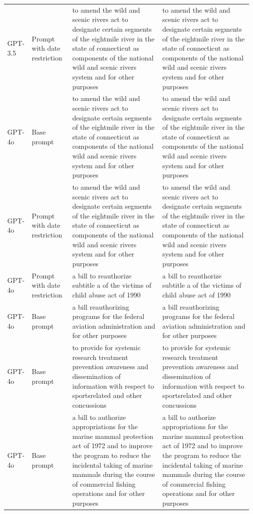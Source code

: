 \begin{longtable}{>{\raggedright\arraybackslash}p{1.4cm}>{\raggedright\arraybackslash}p{1.4cm}>{\raggedright\arraybackslash}p{5.5cm}>{\raggedright\arraybackslash}p{5.5cm}}
GPT-3.5 & Prompt with date restriction & to amend the wild and scenic rivers act to designate certain segments of the eightmile river in the state of connecticut as components of the national wild and scenic rivers system and for other purposes & to amend the wild and scenic rivers act to designate certain segments of the eightmile river in the state of connecticut as components of the national wild and scenic rivers system and for other purposes\\
GPT-4o & Base prompt & to amend the wild and scenic rivers act to designate certain segments of the eightmile river in the state of connecticut as components of the national wild and scenic rivers system and for other purposes & to amend the wild and scenic rivers act to designate certain segments of the eightmile river in the state of connecticut as components of the national wild and scenic rivers system and for other purposes\\
GPT-4o & Prompt with date restriction & to amend the wild and scenic rivers act to designate certain segments of the eightmile river in the state of connecticut as components of the national wild and scenic rivers system and for other purposes & to amend the wild and scenic rivers act to designate certain segments of the eightmile river in the state of connecticut as components of the national wild and scenic rivers system and for other purposes\\
GPT-4o & Prompt with date restriction & a bill to reauthorize subtitle a of the victims of child abuse act of 1990 & a bill to reauthorize subtitle a of the victims of child abuse act of 1990\\
GPT-4o & Base prompt & a bill reauthorizing programs for the federal aviation administration and for other purposes & a bill reauthorizing programs for the federal aviation administration and for other purposes\\
GPT-4o & Base prompt & to provide for systemic research treatment prevention awareness and dissemination of information with respect to sportsrelated and other concussions & to provide for systemic research treatment prevention awareness and dissemination of information with respect to sportsrelated and other concussions\\
GPT-4o & Base prompt & a bill to authorize appropriations for the marine mammal protection act of 1972 and to improve the program to reduce the incidental taking of marine mammals during the course of commercial fishing operations and for other purposes & a bill to authorize appropriations for the marine mammal protection act of 1972 and to improve the program to reduce the incidental taking of marine mammals during the course of commercial fishing operations and for other purposes\\

\end{longtable}
